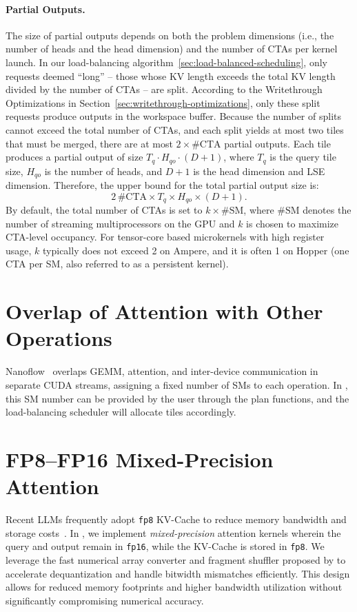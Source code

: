 \paragraph{Partial Outputs.} The size of partial outputs depends on both the problem dimensions (i.e., the number of heads and the head dimension) and the number of CTAs per kernel launch. In our load-balancing algorithm~\ref{sec:load-balanced-scheduling}, only requests deemed ``long'' -- those whose KV length exceeds the total KV length divided by the number of CTAs -- are split. According to the Writethrough Optimizations in Section~\ref{sec:writethrough-optimizations}, only these split requests produce outputs in the workspace buffer. Because the number of splits cannot exceed the total number of CTAs, and each split yields at most two tiles that must be merged, there are at most \(2 \times \#\text{CTA}\) partial outputs. Each tile produces a partial output of size \(T_q \cdot H_{qo} \cdot (D + 1) \), where \(T_q\) is the query tile size, \(H_{qo}\) is the number of heads, and \(D+1\) is the head dimension and LSE dimension. Therefore, the upper bound for the total partial output size is:
\[
  2\,\#\text{CTA} \times T_q \times H_{qo} \times (D + 1).
\]
By default, the total number of CTAs is set to $k \times \#\text{SM}$, where $\#\text{SM}$ denotes the number of streaming multiprocessors on the GPU and $k$ is chosen to maximize CTA-level occupancy.
For tensor-core based microkernels with high register usage, $k$ typically does not exceed 2 on Ampere, and it is often 1 on Hopper (one CTA per SM, also referred to as a persistent kernel).

\section{Overlap of Attention with Other Operations}
\label{sec:overlap-attention}

Nanoflow~\cite{zhu2024nanoflow} overlaps GEMM, attention, and inter-device communication in separate CUDA streams, assigning a fixed number of SMs to each operation. In \sys, this SM number can be provided by the user through the plan functions, and the \sys load-balancing scheduler will allocate tiles accordingly.

\section{FP8--FP16 Mixed-Precision Attention}
\label{sec:mixed-precision}

Recent LLMs frequently adopt \texttt{fp8} KV-Cache to reduce memory bandwidth and storage costs~\cite{micikevicius2022fp8}. In \sys, we implement \emph{mixed-precision} attention kernels wherein the query and output remain in \texttt{fp16}, while the KV-Cache is stored in \texttt{fp8}. We leverage the fast numerical array converter and fragment shuffler proposed by \citet{gupta2024mixed} to accelerate dequantization and handle bitwidth mismatches efficiently. This design allows for reduced memory footprints and higher bandwidth utilization without significantly compromising numerical accuracy.


